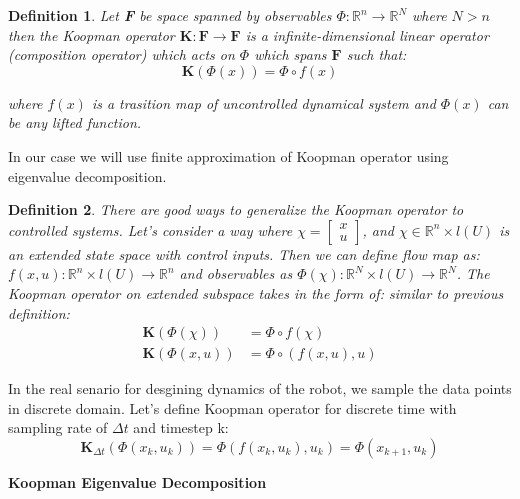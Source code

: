 \documentclass[11pt, reqno, letterpaper, twoside]{amsart}
\newtheorem{definition}{Definition}
\theoremstyle{plain}
\theoremstyle{definition}
\begin{document}
\begin{definition}
    Let \textbf{F} be space spanned by observables $ \Phi: \mathbb{R}^n \rightarrow \mathbb{R}^N $ where $N > n$ then the Koopman operator
    $\textbf{K}: \textbf{F} \rightarrow \textbf{F}$ is a infinite-dimensional linear operator (composition operator) which acts on $\Phi$ which spans $\textbf{F}$ such that:
    \begin{equation}
        \textbf{K}(\Phi(x)) = \Phi \circ f(x)
    \end{equation}

    where $f(x)$ is a trasition map of uncontrolled dynamical system and $\Phi(x)$ can be any lifted function.
\end{definition}

In our case we will use finite approximation of Koopman operator using eigenvalue decomposition.

\begin{definition}
    There are good ways to generalize the Koopman operator to controlled systems. Let's consider a way where $ \chi = \begin{bmatrix}
        x \\
        u
    \end{bmatrix}$, and $ \chi \in \mathbb{R}^n \times l(U)$ is an extended state space with control inputs. Then we can define flow map as: $ f(x,u) : \mathbb{R}^n \times l(U) \rightarrow \mathbb{R}^n $ and observables as $\Phi(\chi): \mathbb{R}^N \times l(U) \rightarrow \mathbb{R}^N $. The Koopman operator on extended subspace takes in the form of:
    similar to previous definition:
    \begin{equation}
        \begin{split}
            \textbf{K}(\Phi(\chi)) &= \Phi \circ f(\chi) \\
            \textbf{K}(\Phi(x,u)) &= \Phi \circ (f(x,u),u)
        \end{split}
    \end{equation}
\end{definition}

In the real senario for desgining dynamics of the robot, we sample the data points in discrete domain. Let's define Koopman operator for discrete time 
with sampling rate of $\Delta t$ and timestep k:
\begin{equation}
    \textbf{K}_{\Delta t} (\Phi(x_k,u_k)) = \Phi(f(x_k,u_k),u_k) = \Phi(x_{k+1},u_k)
\end{equation}

\vspace{15pt}
\textbf{Koopman Eigenvalue Decomposition}
\end{document}

